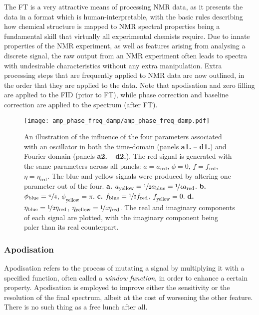 The \ac{FT} is a very attractive means of processing \ac{NMR} data, as it
presents the data in a format which is human-interpretable, with the basic
rules describing how chemical structure is mapped to \ac{NMR} spectral
properties being a fundamental skill that virtually all experimental chemists
require\cite{Hore2015b}. Due to innate properties of the \ac{NMR} experiment,
as well as features arising from analysing a discrete signal, the raw output
from an \ac{NMR} experiment often leads to spectra with undesirable
characteristics without any extra manipulation. Extra processing
steps that are frequently applied to \ac{NMR} data are now outlined, in the
order that they are applied to the data. Note that apodisation and zero filling
are applied to the \ac{FID} (prior to \ac{FT}), while phase correction and
baseline correction are applied to the spectrum (after \ac{FT}).

\begin{figure}
    \centering
    \texttt{[image: amp\_phase\_freq\_damp/amp\_phase\_freq\_damp.pdf]}
    \caption[
        An illustration of the influence of the four parameters associated
        with an oscillator in both the time-domain nels and Fourier-domain.
    ]{
        An illustration of the influence of the four parameters associated
        with an oscillator in both the time-domain (panels \textbf{a1.} --
        \textbf{d1.}) and Fourier-domain (panels \textbf{a2.} -- \textbf{d2.}).
        The red signal is generated with the same parameters across all panels:
        $a = a_{\text{red}}$, $\phi = 0$, $f = f_{\text{red}}$,  $\eta =
        \eta_{\text{red}}$.  The blue and yellow signals were produced by
        altering one parameter out of the four.
        \textbf{a.} $a_{\text{yellow}} = \nicefrac{1}{2} a_{\text{blue}} =
        \nicefrac{1}{4} a_{\text{red}}$.
        \textbf{b.}
        $\phi_{\text{blue}} = \nicefrac{\pi}{4}$,
        $\phi_{\text{yellow}} = \pi$.
        \textbf{c.}
        $f_{\text{blue}} = \nicefrac{1}{2} f_{\text{red}}$,
        $f_{\text{yellow}} = 0$.
        \textbf{d.}
        $\eta_{\text{blue}} = \nicefrac{1}{2}\eta_{\text{red}}$,
        $\eta_{\text{yellow}} = \nicefrac{1}{4}\eta_{\text{red}}$.
        The real and imaginary components of each signal are plotted, with the
        imaginary component being paler than its real counterpart.
    }
    \label{fig:amp-phase-freq-damp}
\end{figure}



\subsubsection{Apodisation}
Apodisation refers to the process of mutating a signal by multiplying it with a
specified function, often called a \emph{window function}, in order to enhance
a certain property. Apodisation is employed to improve either the sensitivity
or the resolution of the final spectrum, albeit at the cost of worsening the
other feature. There is no such thing as a free lunch after all.

